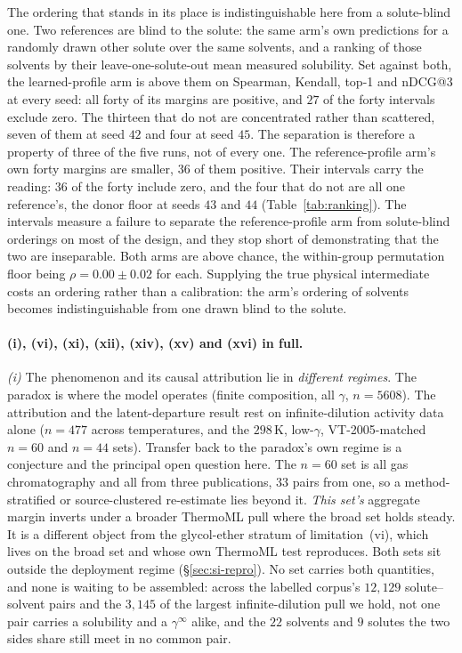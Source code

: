 The ordering that stands in its place is indistinguishable here from a solute-blind one. Two references are
blind to the solute: the same arm's own predictions for a randomly drawn other solute over the
same solvents, and a ranking of those solvents by their leave-one-solute-out mean measured
solubility. Set against both, the learned-profile arm is above them on Spearman, Kendall, top-1 and
nDCG@3 at every seed: all forty of its margins are positive, and $27$ of the forty intervals exclude
zero. The thirteen that do not are concentrated rather than scattered, seven of them at seed $42$ and
four at seed $45$. The separation is therefore a property of three of the five runs, not of every
one.
The reference-profile arm's own forty margins are smaller, $36$ of them positive. Their intervals
carry the reading: $36$ of the forty include zero, and the four that do not are all one reference's,
the donor floor at seeds $43$ and $44$
(Table~\ref{tab:ranking}). The intervals measure a failure to separate the reference-profile arm
from solute-blind orderings on most of the design, and they stop short of demonstrating that the two
are inseparable. Both arms are above chance, the within-group permutation floor being
$\rho=0.00\pm0.02$ for each. Supplying the true physical intermediate costs an ordering rather than
a calibration: the arm's ordering of solvents becomes indistinguishable from one drawn blind to the
solute.





\paragraph{(i), (vi), (xi), (xii), (xiv), (xv) and (xvi) in full.}
\emph{(i)} The phenomenon and its causal attribution lie in \emph{different regimes}. The paradox is
where the model operates (finite composition, all $\gamma$, $n{=}5608$). The attribution and the
latent-departure result rest on infinite-dilution activity data alone ($n{=}477$ across
temperatures, and the $298$\,K, low-$\gamma$, VT-2005-matched $n{=}60$ and $n{=}44$ sets). Transfer
back to the paradox's own regime is a conjecture and the principal open question here. The $n{=}60$
set is all gas chromatography and all from three publications, $33$ pairs from one, so a
method-stratified or source-clustered re-estimate lies beyond it. \emph{This set's} aggregate margin
inverts under a broader ThermoML pull where the broad set holds steady. It is a different object
from the glycol-ether stratum of limitation~(vi), which lives on the broad set and whose own
ThermoML test reproduces. Both sets sit outside the deployment regime
(\S\ref{sec:si-repro}). No set carries both quantities, and none is waiting to be assembled:
across the labelled corpus's $12{,}129$ solute--solvent pairs and the $3{,}145$ of the largest
infinite-dilution pull we hold, not one pair carries a solubility and a $\gamma^\infty$ alike, and
the $22$ solvents and $9$ solutes the two sides share still meet in no common pair.

